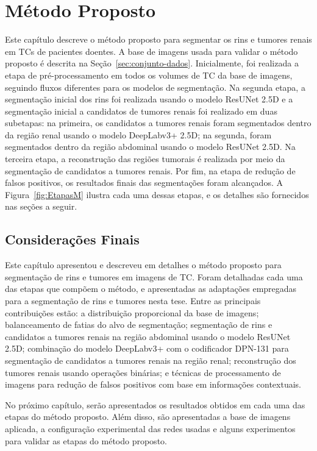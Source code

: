 \chapter{Método Proposto}
\label{cap:materiais-metodo}

Este capítulo descreve o método proposto para segmentar os rins e tumores renais em TCs de pacientes doentes. A base de imagens usada para validar o método proposto é descrita na Seção~\ref{sec:conjunto-dados}. Inicialmente, foi realizada a etapa de pré-processamento em todos os volumes de TC da base de imagens, seguindo fluxos diferentes para os modelos de segmentação. Na segunda etapa, a segmentação inicial dos rins foi realizada usando o modelo ResUNet 2.5D e a segmentação inicial a candidatos de tumores renais foi realizado em duas subetapas: na primeira, os candidatos a tumores renais foram segmentados dentro da região renal usando o modelo DeepLabv3+ 2.5D; na segunda, foram segmentados dentro da região abdominal usando o modelo ResUNet 2.5D. Na terceira etapa, a reconstrução das regiões tumorais é realizada por meio da segmentação de candidatos a tumores renais. Por fim, na etapa de redução de falsos positivos, os resultados finais das segmentações foram alcançados. A Figura~\ref{fig:EtapasM} ilustra cada uma dessas etapas, e os detalhes são fornecidos nas seções a seguir.



\section{Considerações Finais}
\label{consideracoes-finais-metodo}

Este capítulo apresentou e descreveu em detalhes o método proposto para segmentação de rins e tumores em imagens de TC. Foram detalhadas cada uma das etapas que compõem o método, e apresentadas as adaptações empregadas para a segmentação de rins e tumores nesta tese. Entre as principais contribuições estão: a distribuição proporcional da base de imagens; balanceamento de fatias do alvo de segmentação; segmentação de rins e candidatos a tumores renais na região abdominal usando o modelo ResUNet 2.5D; combinação do modelo DeepLabv3+ com o codificador DPN-131 para segmentação de candidatos a tumores renais na região renal; reconstrução dos tumores renais usando operações binárias; e técnicas de processamento de imagens para redução de falsos positivos com base em informações contextuais.


No próximo capítulo, serão apresentados os resultados obtidos em cada uma das etapas do método proposto. Além disso, são apresentadas a base de imagens aplicada, a configuração experimental das redes usadas e alguns experimentos para validar as etapas do método proposto.
